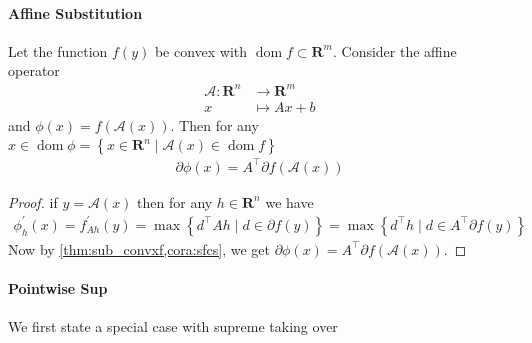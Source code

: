 \documentclass{article}
\newcommand{\dom}{\operatorname{dom}}
\begin{document}
\paragraph{Affine Substitution}
Let the function $f(y)$ be convex with  $\dom f \subset \mathbf{R}^{m}$. Consider the affine operator
\begin{align*}
\mathcal{A}: \mathbf{R}^{n} &\rightarrow \mathbf{R}^{m}\\
  x &\mapsto A x+b
\end{align*}
and $\phi(x)=f(\mathcal{A}(x))$.
Then for any $x \in \dom  \phi=\left\{x \in \mathbf{R}^{n} \mid \mathcal{A}(x) \in \dom  f\right\}$
\begin{align}
\partial \phi(x)=A^{\top}\partial f(\mathcal{A}(x))\label{eq:aff_subg}
\end{align}
\begin{proof}\color{ForestGreen}
 if $y=\mathcal{A}(x)$ then for any $h \in \mathbf{R}^{n}$ we have
\begin{align*}
\phi_{h}^{\prime}(x)=f_{A h}^{\prime}(y)=\max \left\{d^{\top}A h \mid d \in \partial f(y)\right\}=\max \left\{{d}^{\top}h \mid {d} \in A^{\top}\partial f(y)\right\}
\end{align*}
Now by \cref{thm:sub_convxf,cora:sfcs}, we get $\partial \phi(x)=A^{\top}\partial f(\mathcal{A}(x))$.
\end{proof}
\paragraph{Pointwise Sup} 

We first state a special case with supreme taking over 
\end{document}
